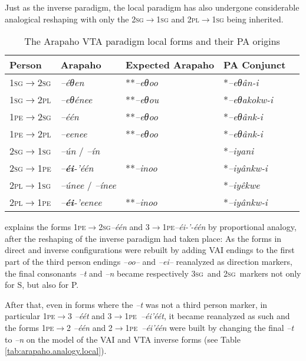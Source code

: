 \documentclass[twoside,a4paper,11pt]{article}
\newcommand{\ipa}[1]{{\phon\textit{#1}}}
\newcommand{\sg}{\textsc{sg}}
\newcommand{\pl}{\textsc{pl}}
\newcommand{\grise}[1]{\cellcolor{lightgray}\textbf{#1}}
\newcommand{\pe}{\textsc{pe}}
\begin{document}
Just as the inverse paradigm, the local paradigm has also undergone considerable analogical reshaping with only the 2\sg{}$\rightarrow$1\sg{} and 2\pl{}$\rightarrow$1\sg{} being inherited. 

\begin{table}[H]
\caption{The Arapaho VTA paradigm local forms and their PA origins}
\centering \label{tab:vta.3}
\begin{tabular}{lllll}
\toprule
Person & Arapaho & Expected Arapaho&PA Conjunct    \\
\midrule
1\sg$\rightarrow$2\sg & \ipa{--éθen} \grise{}& **\ipa{--eθoo} &*\ipa{--eθân-i}   \\
1\sg$\rightarrow$2\pl &\ipa{--eθénee} \grise{}& **\ipa{--eθou} &*\ipa{--eθakokw-i} & \\
1\pe$\rightarrow$2\sg &\ipa{--één} \grise{}& **\ipa{--eθoo} &*\ipa{--eθânk-i} &   \\
1\pe$\rightarrow$2\pl &\ipa{--eenee} \grise{}& **\ipa{--eθoo} &*\ipa{--eθânk-i} &   \\
\midrule 
2\sg$\rightarrow$1\sg &\ipa{--ún} / \ipa{--ín} &   & *\ipa{--iyani}     \\
2\sg$\rightarrow$1\pe & \ipa{--\textbf{éi}-'één}\grise{}& **\ipa{--inoo}&*\ipa{--iyânkw-i} &  \\
2\pl$\rightarrow$1\sg &\ipa{--únee} / \ipa{--ínee} &  &*\ipa{--iyêkwe} &   \\
2\pl$\rightarrow$1\pe &\ipa{--\textbf{éi}-'eenee}\grise{} & **\ipa{--inoo}&*\ipa{--iyânkw-i} &   \\
\bottomrule
\end{tabular}
\end{table}

\citet[23]{goddard65arapaho} explains the forms 1\pe$\rightarrow$2\sg \ipa{--één} and 3$\rightarrow$1\pe \ipa{--éi-'-één} by proportional analogy, after the reshaping of the inverse paradigm had taken place: As the forms in direct and inverse configurations were rebuilt by adding VAI endings to the first part of the third person endings \ipa{--oo--} and \ipa{--ei--} reanalyzed as direction markers, the final consonants \ipa{--t} and \ipa{--n} became   respectively 3\sg\ and 2\sg\ markers not only for  S, but also for P.

After that, even in forms where the \ipa{--t} was not a third person marker, in particular  1\pe$\rightarrow$3   \ipa{--éét} and   3$\rightarrow$1\pe\   \ipa{--éi'éét}, it became reanalyzed as such and the forms  1\pe$\rightarrow$2   \ipa{--één} and   2$\rightarrow$1\pe\   \ipa{--éi'één} were built by changing the final \ipa{--t} to \ipa{--n} on the model of the VAI and VTA inverse forms (see Table  \ref{tab:arapaho.analogy.local}).
\end{document}
